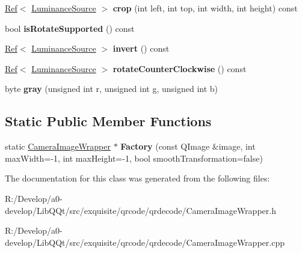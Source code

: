 \begin{DoxyCompactItemize}
\mbox{\hyperlink{classzxing_1_1_ref}{Ref}}$<$ \mbox{\hyperlink{classzxing_1_1_luminance_source}{Luminance\+Source}} $>$ {\bfseries crop} (int left, int top, int width, int height) const
\item 
\mbox{\label{class_camera_image_wrapper_a988760ef8537ec4b12639d93d2c6c637}} 
bool {\bfseries is\+Rotate\+Supported} () const
\item 
\mbox{\label{class_camera_image_wrapper_aa4649492ed69a638e33c80a692d8f469}} 
\mbox{\hyperlink{classzxing_1_1_ref}{Ref}}$<$ \mbox{\hyperlink{classzxing_1_1_luminance_source}{Luminance\+Source}} $>$ {\bfseries invert} () const
\item 
\mbox{\label{class_camera_image_wrapper_abbbad67697d2d407e326bfdcac10814d}} 
\mbox{\hyperlink{classzxing_1_1_ref}{Ref}}$<$ \mbox{\hyperlink{classzxing_1_1_luminance_source}{Luminance\+Source}} $>$ {\bfseries rotate\+Counter\+Clockwise} () const
\item 
\mbox{\label{class_camera_image_wrapper_a297ef5f976cebe46968699208296ab1a}} 
byte {\bfseries gray} (unsigned int r, unsigned int g, unsigned int b)
\end{DoxyCompactItemize}
\subsection*{Static Public Member Functions}
\begin{DoxyCompactItemize}
\item 
\mbox{\label{class_camera_image_wrapper_a3100c6ebda573a21dbca98adcf9c1e9b}} 
static \mbox{\hyperlink{class_camera_image_wrapper}{Camera\+Image\+Wrapper}} $\ast$ {\bfseries Factory} (const Q\+Image \&image, int max\+Width=-\/1, int max\+Height=-\/1, bool smooth\+Transformation=false)
\end{DoxyCompactItemize}


The documentation for this class was generated from the following files\+:\begin{DoxyCompactItemize}
\item 
R\+:/\+Develop/a0-\/develop/\+Lib\+Q\+Qt/src/exquisite/qrcode/qrdecode/Camera\+Image\+Wrapper.\+h\item 
R\+:/\+Develop/a0-\/develop/\+Lib\+Q\+Qt/src/exquisite/qrcode/qrdecode/Camera\+Image\+Wrapper.\+cpp\end{DoxyCompactItemize}
